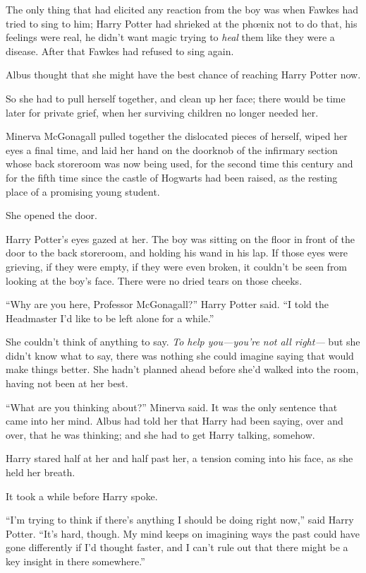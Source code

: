 The only thing that had elicited any reaction from the boy was when Fawkes had tried to sing to him; Harry Potter had shrieked at the phœnix not to do that, his feelings were real, he didn’t want magic trying to \emph{heal} them like they were a disease. After that Fawkes had refused to sing again.

Albus thought that she might have the best chance of reaching Harry Potter now.

So she had to pull herself together, and clean up her face; there would be time later for private grief, when her surviving children no longer needed her.

Minerva McGonagall pulled together the dislocated pieces of herself, wiped her eyes a final time, and laid her hand on the doorknob of the infirmary section whose back storeroom was now being used, for the second time this century and for the fifth time since the castle of Hogwarts had been raised, as the resting place of a promising young student.

She opened the door.

Harry Potter’s eyes gazed at her. The boy was sitting on the floor in front of the door to the back storeroom, and holding his wand in his lap. If those eyes were grieving, if they were empty, if they were even broken, it couldn’t be seen from looking at the boy’s face. There were no dried tears on those cheeks.

“Why are you here, Professor McGonagall?” Harry Potter said. “I told the Headmaster I’d like to be left alone for a while.”

She couldn’t think of anything to say. \emph{To help you—you’re not all right—} but she didn’t know what to say, there was nothing she could imagine saying that would make things better. She hadn’t planned ahead before she’d walked into the room, having not been at her best.

“What are you thinking about?” Minerva said. It was the only sentence that came into her mind. Albus had told her that Harry had been saying, over and over, that he was thinking; and she had to get Harry talking, somehow.

Harry stared half at her and half past her, a tension coming into his face, as she held her breath.

It took a while before Harry spoke.

“I’m trying to think if there’s anything I should be doing right now,” said Harry Potter. “It’s hard, though. My mind keeps on imagining ways the past could have gone differently if I’d thought faster, and I can’t rule out that there might be a key insight in there somewhere.”

